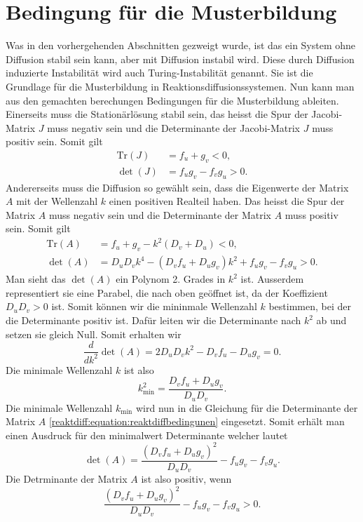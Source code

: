 \section{Bedingung für die Musterbildung
\label{reaktdiff:section:diffusioninduzierteInstabilitaet}}
Was in den vorhergehenden Abschnitten gezweigt wurde, ist das ein System ohne Diffusion stabil sein kann, aber mit Diffusion instabil wird.
Diese durch Diffusion induzierte Instabilität wird auch Turing-Instabilität genannt.
Sie ist die Grundlage für die Musterbildung in Reaktionsdiffusionssystemen.
Nun kann man aus den gemachten berechungen Bedingungen für die Musterbildung ableiten.
Einerseits muss die Stationärlösung stabil sein, das heisst die Spur der Jacobi-Matrix \(J\) muss negativ sein und die Determinante der Jacobi-Matrix \(J\) muss positiv sein.
Somit gilt
\begin{align*}
    \text{Tr}(J) &= f_u + g_v < 0, \\
    \det(J) &= f_u g_v - f_v g_u > 0.
\end{align*}
Andererseits muss die Diffusion so gewählt sein, dass die Eigenwerte der Matrix \(A\) mit der Wellenzahl \(k\) einen positiven Realteil haben.
Das heisst die Spur der Matrix \(A\) muss negativ sein und die Determinante der Matrix \(A\) muss positiv sein.
Somit gilt
\begin{align}
    \text{Tr}(A) &= f_u  + g_v - k^2(D_v + D_u)  < 0, \\
    \det(A) &= D_uD_vk^4 - (D_vf_u + D_ug_v)k^2 + f_u g_v - f_v g_u > 0.
    \label{reaktdiff:equation:reaktdiffbedingunen}
\end{align}
Man sieht das \(\det(A)\) ein Polynom 2. Grades in \(k^2\) ist.
Ausserdem representiert sie eine Parabel, die nach oben geöffnet ist, da der Koeffizient \(D_uD_v > 0\) ist.
Somit können wir die mininmale Wellenzahl \(k\) bestimmen, bei der die Determinante positiv ist.
Dafür leiten wir die Determinante nach \(k^2\) ab und setzen sie gleich Null.
Somit erhalten wir
\begin{equation*}
    \frac{d}{dk^2} \det(A) = 2D_uD_vk^2 - D_v f_u - D_u g_v = 0.
\end{equation*}
Die minimale Wellenzahl \(k\) ist also
\begin{equation*}
    k^2_{\text{min}} = \frac{D_vf_u + D_ug_v}{D_uD_v}.
\end{equation*}
Die minimale Wellenzahl \(k_{\text{min}}\) wird nun in die Gleichung für die Determinante der Matrix \(A\) \ref{reaktdiff:equation:reaktdiffbedingunen} eingesetzt.
Somit erhält man einen Ausdruck für den minimalwert Determinante welcher lautet
\begin{equation*}
    \det(A) = \frac{(D_vf_u + D_ug_v)^2}{D_uD_v} - f_u g_v - f_v g_u.
\end{equation*}
Die Detrminante der Matrix \(A\) ist also positiv, wenn
\begin{equation*}
    \frac{(D_vf_u + D_ug_v)^2}{D_uD_v} - f_u g_v - f_v g_u > 0.
\end{equation*}



